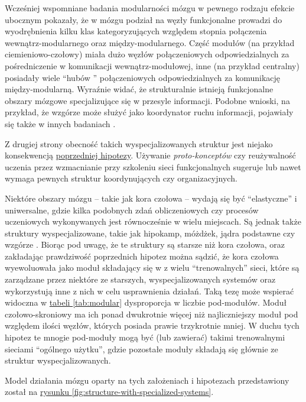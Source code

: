 Wcześniej wspomniane badania modularności mózgu \cite{meunier2009hierarchical} w pewnego rodzaju efekcie ubocznym pokazały, że w mózgu podział na węzły funkcjonalne prowadzi do wyodrębnienia kilku klas kategoryzujących względem stopnia połączenia wewnątrz-modularnego oraz między-modularnego.
Część modułów (na przykład ciemieniowo-czołowy) miała dużo węzłów połączeniowych odpowiedzialnych za pośredniczenie w komunikacji wewnątrz-modułowej, inne (na przykład centralny) posiadały wiele ``hubów '' połączeniowych odpowiedzialnych za komunikację między-modularną.
Wyraźnie widać, że strukturalnie istnieją funkcjonalne obszary mózgowe specjalizujące się w przesyle informacji.
Podobne wnioski, na przykład, że wzgórze może służyć jako koordynator ruchu informacji, pojawiały się także w innych badaniach \cite{sherman2005thalamic}.

Z drugiej strony obecność takich wyspecjalizowanych struktur jest niejako konsekwencją \hyperref[subsec:cost-function-is-diverse]{poprzedniej hipotezy}.
Używanie \emph{proto-konceptów} czy reużywalność uczenia przez wzmacnianie przy szkoleniu sieci funkcjonalnych sugeruje lub nawet wymaga pewnych struktur koordynujących czy organizacyjnych.

Niektóre obszary mózgu -- takie jak kora czołowa -- wydają się być ``elastyczne'' i uniwersalne, gdzie kilka podobnych zdań obliczeniowych czy procesów uczeniowych wykonywanych jest równocześnie w wielu miejscach.
Są jednak także struktury wyspecjalizowane, takie jak hipokamp, móżdżek, jądra podstawne czy wzgórze \cite{solari2011cognitive}.
Biorąc pod uwagę, że te struktury są starsze niż kora czołowa, oraz zakładając prawdziwość poprzednich hipotez można sądzić, że kora czołowa wyewoluowała jako  moduł składający się w z wielu ``trenowalnych'' sieci, które są zarządzane przez niektóre ze starszych, wyspecjalizowanych systemów oraz wykorzystują inne z nich w celu usprawnienia działań.
Taką tezę może wspierać widoczna w \hyperref[tab:modular]{tabeli \ref*{tab:modular}} dysproporcja w liczbie pod-modułów.
Moduł czołowo-skroniowy ma ich ponad dwukrotnie więcej niż najliczniejszy moduł pod względem ilości węzłów, których posiada prawie trzykrotnie mniej.
W duchu tych hipotez te mnogie pod-moduły mogą być (lub zawierać) takimi trenowalnymi sieciami ``ogólnego użytku'', gdzie pozostałe moduły składają się głównie ze struktur wyspecjalizowanych.

Model działania mózgu oparty na tych założeniach i hipotezach przedstawiony został na \hyperref[fig:structure-with-specialized-systems]{rysunku \ref*{fig:structure-with-specialized-systems}}.

